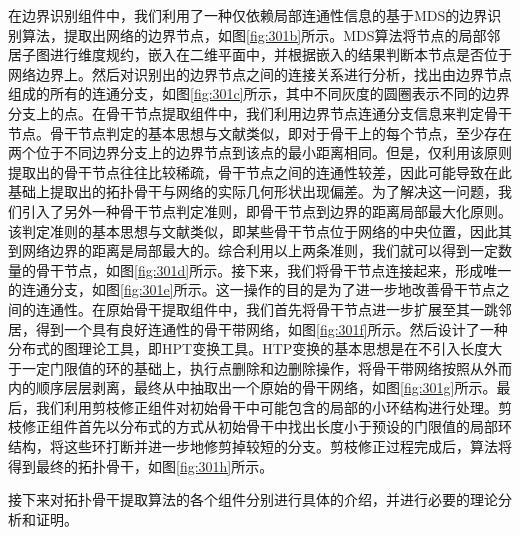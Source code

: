 在边界识别组件中，我们利用了一种仅依赖局部连通性信息的基于MDS的边界识别算法，提取出网络的边界节点，如图\ref{fig:301b}所示。MDS算法将节点的局部邻居子图进行维度规约，嵌入在二维平面中，并根据嵌入的结果判断本节点是否位于网络边界上。然后对识别出的边界节点之间的连接关系进行分析，找出由边界节点组成的所有的连通分支，如图\ref{fig:301c}所示，其中不同灰度的圆圈表示不同的边界分支上的点。在骨干节点提取组件中，我们利用边界节点连通分支信息来判定骨干节点。骨干节点判定的基本思想与文献类似，即对于骨干上的每个节点，至少存在两个位于不同边界分支上的边界节点到该点的最小距离相同。但是，仅利用该原则提取出的骨干节点往往比较稀疏，骨干节点之间的连通性较差，因此可能导致在此基础上提取出的拓扑骨干与网络的实际几何形状出现偏差。为了解决这一问题，我们引入了另外一种骨干节点判定准则，即骨干节点到边界的距离局部最大化原则。该判定准则的基本思想与文献类似，即某些骨干节点位于网络的中央位置，因此其到网络边界的距离是局部最大的。综合利用以上两条准则，我们就可以得到一定数量的骨干节点，如图\ref{fig:301d}所示。接下来，我们将骨干节点连接起来，形成唯一的连通分支，如图\ref{fig:301e}所示。这一操作的目的是为了进一步地改善骨干节点之间的连通性。在原始骨干提取组件中，我们首先将骨干节点进一步扩展至其一跳邻居，得到一个具有良好连通性的骨干带网络，如图\ref{fig:301f}所示。然后设计了一种分布式的图理论工具，即HPT变换工具。HTP变换的基本思想是在不引入长度大于一定门限值的环的基础上，执行点删除和边删除操作，将骨干带网络按照从外而内的顺序层层剥离，最终从中抽取出一个原始的骨干网络，如图\ref{fig:301g}所示。最后，我们利用剪枝修正组件对初始骨干中可能包含的局部的小环结构进行处理。剪枝修正组件首先以分布式的方式从初始骨干中找出长度小于预设的门限值的局部环结构，将这些环打断并进一步地修剪掉较短的分支。剪枝修正过程完成后，算法将得到最终的拓扑骨干，如图\ref{fig:301h}所示。

接下来对拓扑骨干提取算法的各个组件分别进行具体的介绍，并进行必要的理论分析和证明。
